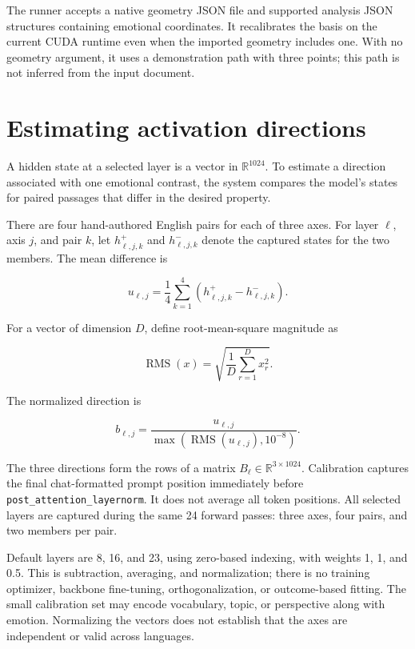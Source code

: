 \documentclass[manuscript,screen,nonacm]{acmart}
\begin{document}
The runner accepts a native geometry JSON file and supported analysis
JSON structures containing emotional coordinates. It recalibrates the
basis on the current CUDA runtime even when the imported geometry
includes one. With no geometry argument, it uses a demonstration path
with three points; this path is not inferred from the input document.


\section{Estimating activation
directions}\label{estimating-activation-directions}

A hidden state at a selected layer is a vector in \(\mathbb{R}^{1024}\).
To estimate a direction associated with one emotional contrast, the
system compares the model's states for paired passages that differ in
the desired property.

There are four hand-authored English pairs for each of three axes. For
layer \(\ell\), axis \(j\), and pair \(k\), let \(h^+_{\ell,j,k}\) and
\(h^-_{\ell,j,k}\) denote the captured states for the two members. The
mean difference is

\[
u_{\ell,j}=\frac14\sum_{k=1}^{4}
\left(h^+_{\ell,j,k}-h^-_{\ell,j,k}\right).
\]

For a vector of dimension \(D\), define root-mean-square magnitude as

\[
\operatorname{RMS}(x)=\sqrt{\frac1D\sum_{r=1}^{D}x_r^2}.
\]

The normalized direction is

\[
b_{\ell,j}=\frac{u_{\ell,j}}
{\max(\operatorname{RMS}(u_{\ell,j}),10^{-8})}.
\]

The three directions form the rows of a matrix
\(B_\ell\in\mathbb{R}^{3\times1024}\). Calibration captures the final
chat-formatted prompt position immediately before
\nolinkurl{post_attention_layernorm}. It does not average all token
positions. All selected layers are captured during the same 24 forward
passes: three axes, four pairs, and two members per pair.

Default layers are 8, 16, and 23, using zero-based indexing, with
weights 1, 1, and 0.5. This is subtraction, averaging, and
normalization; there is no training optimizer, backbone fine-tuning,
orthogonalization, or outcome-based fitting. The small calibration set
may encode vocabulary, topic, or perspective along with emotion.
Normalizing the vectors does not establish that the axes are independent
or valid across languages.
\end{document}

